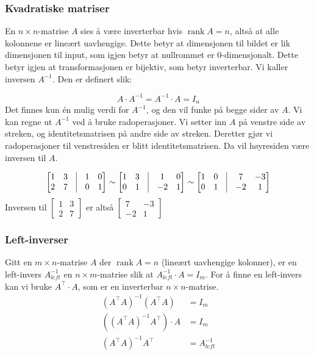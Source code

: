 \documentclass[12pt,a4paper,norsk]{article}
\newcommand{\imat}[1]{\left[\begin{smallmatrix}#1\end{smallmatrix}\right]} %
\DeclareMathOperator{\rank}{rank}
\begin{document}
\subsubsection{Kvadratiske matriser}
En $n \times n$-matrise $A$ sies å være inverterbar hvis $\rank A = n$, altså at alle
kolonnene er lineært uavhengige. Dette betyr at dimensjonen til bildet er lik
dimensjonen til input, som igjen betyr at nullrommet er 0-dimensjonalt. Dette
betyr igjen at transformasjonen er bijektiv, som betyr inverterbar. Vi kaller
inversen $A^{-1}$. Den er definert slik:

\[A \cdot A^{-1} = A^{-1} \cdot A = I_{n}\]
%
Det finnes kun én mulig verdi for $A^{-1}$, og den vil funke på begge sider av
$A$. Vi kan regne ut $A^{-1}$ ved å bruke radoperasjoner. Vi setter inn $A$ på
venstre side av streken, og identitetsmatrisen på andre side av streken.
Deretter gjør vi radoperasjoner til venstresiden er blitt identitetsmatrisen. Da
vil høyresiden være inversen til $A$.

\begin{align*}
  \begin{bmatrix}
    1 & 3 & \vline & 1 & 0 \\
    2 & 7 & \vline & 0 & 1
  \end{bmatrix}
      \sim
  \begin{bmatrix}
    1 & 3 & \vline &  1 & 0 \\
    0 & 1 & \vline & -2 & 1
  \end{bmatrix}
      \sim
  \begin{bmatrix}
    1 & 0 & \vline &  7 & -3 \\
    0 & 1 & \vline & -2 & 1
  \end{bmatrix}
\end{align*}
%
Inversen til $\imat{1 & 3 \\ 2 & 7}$ er altså $\imat{7 & -3 \\ -2 & 1}$

\subsubsection{Left-inverser}
Gitt en $m \times n$-matrise $A$ der $\rank A = n$ (lineært uavhengige kolonner), er
en left-invers $A_{left}^{-1}$ en $n \times m$-matrise slik at
$A_{left}^{-1} \cdot A = I_{m}$. For å finne en left-invers kan vi bruke
$A^{\top} \cdot A$, som er en inverterbar $n \times n$-matrise.
\begin{align*}
  {(A^{\top}A)}^{-1}(A^{\top}A) &= I_{m} \\
  ({(A^{\top}A)}^{-1}A^{\top}) \cdot A &= I_{m} \\
  {(A^{\top}A)}^{-1} A^{\top} &= A_{left}^{-1}
\end{align*}
\end{document}
